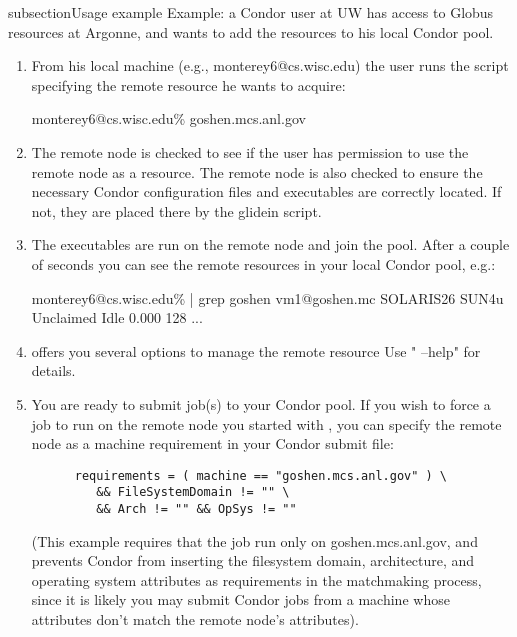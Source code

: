 \begin{enumerate}
subsection{Usage example}
Example: a Condor user at UW has access to Globus resources at 
Argonne, and wants to add the resources to his local Condor pool.

\begin{enumerate}

\item From his local machine (e.g., monterey6@cs.wisc.edu) the user runs 
   the  script specifying the remote resource he wants 
   to acquire:

monterey6@cs.wisc.edu\%  goshen.mcs.anl.gov

\item The remote node is checked to see if the user has permission to
   use the remote node as a resource. The remote node is also checked
   to ensure the necessary Condor configuration files and executables
   are correctly located. If not, they are placed there by the glidein
   script.

\item The executables are run on the remote node and join the pool.
   After a couple of seconds you can see the remote resources in your 
   local Condor pool, e.g.:

   monterey6@cs.wisc.edu\%  | grep goshen
      vm1@goshen.mc SOLARIS26   SUN4u  Unclaimed  Idle       0.000   128 ...

\item {} offers you several options to manage the remote resource
   Use " --help" for details.

\item You are ready to submit job(s) to your Condor pool. If you wish to force
   a job to run on the remote node you started with , you can
   specify the remote node as a machine requirement in your Condor submit
   file: 
\begin{verbatim}
      requirements = ( machine == "goshen.mcs.anl.gov" ) \
         && FileSystemDomain != "" \
         && Arch != "" && OpSys != ""
\end{verbatim}
   (This example requires that the job run only on goshen.mcs.anl.gov, and
   prevents Condor from inserting the filesystem domain, architecture, and 
   operating system attributes as requirements in the matchmaking process,
   since it is likely you may submit Condor jobs from a machine whose
   attributes don't match the remote node's attributes).

\end{enumerate}


\end{enumerate}
